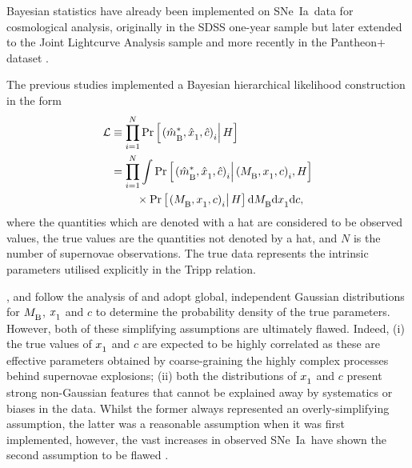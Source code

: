 \documentclass[fleqn,usenatbib,onecolumn,referee]{mnras}
\newcommand{\pplus}{Pantheon$+$}
\newcommand{\sne}{SNe~Ia}
\newcommand{\diff}{\mathrm{d}}
\newcommand{\prior}{\mathrm{Pr}}
\newcommand{\Z}[1]{_{\lower2pt\hbox{$\scriptstyle#1$}}}
\newcommand{\Ns}[1]{_{\lower2pt\hbox{$\scriptstyle\rm#1$}}}
\newcommand{\hblank}[1]{\hbox to#1 mm{\hfil}}
\begin{document}
Bayesian statistics have already been implemented on \sne\ data for cosmological analysis, originally in the SDSS one-year sample \citep{Kessler_2009_Sloan, March_2011} but later extended to the Joint Lightcurve Analysis \citep[JLA,][]{Betoule_2014} sample \citep{Nielsen_2016, Dam_2017} and more recently in the \pplus\ \citep{Scolnic_2022, Brout_2022_cosmo, Brout_2022_cal} dataset \citep{Lane_2023}. 

The previous studies implemented a Bayesian hierarchical likelihood construction in the form
\begin{align}\label{eq:likelihood}
    \mathcal{L} &\equiv \prod_{i = 1}^N \prior\left[\left.(\hat{m}\Ns{B}^{*}, \hat{x}\Z 1, \hat{c}) \Z i \right| H\right] \nonumber\\
    &=  \prod_{i = 1}^N \int \prior\left[\left.(\hat{m}\Ns{B}^{*}, \hat{x}\Z 1, \hat{c}) \Z i \right| (M\Ns{B},x\Z 1,c) \Z i, H\right] \nonumber\\
    &\hblank{8} \times \prior\left[\left.(M\Ns{B}, x\Z 1, c) \Z i \right| H\right]  \diff M\Ns{B} \diff x\Z 1 \diff c,
\end{align}
where the quantities which are denoted with a hat are considered to be observed values, the true values are the quantities not denoted by a hat, and $N$ is the number of supernovae observations. The true data represents the intrinsic parameters utilised explicitly in the Tripp \citep{Tripp_1998} relation.

\citet{Nielsen_2016}, \citet{Dam_2017} and \citet{Lane_2023} follow the analysis of \citet{March_2011} and adopt global, independent Gaussian distributions for $M \Ns{B}$, $x\Z 1$ and $c$ to determine the probability density of the true parameters. However, both of these simplifying assumptions are ultimately flawed. Indeed, (i) the true values of $x\Z 1$ and $c$ are expected to be highly correlated as these are effective parameters obtained by coarse-graining the highly complex processes behind supernovae explosions; (ii) both the distributions of $x\Z1$ and $c$ present strong non-Gaussian features that cannot be explained away by systematics or biases in the data. Whilst the former always represented an overly-simplifying assumption, the latter was a reasonable assumption when it was first implemented, however, the vast increases in observed \sne\ have shown the second assumption to be flawed \citep{Hinton_2019}. 
\end{document}

